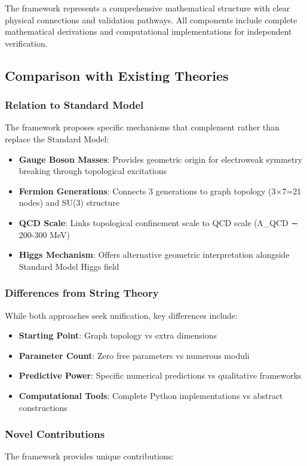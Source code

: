 \documentclass[12pt,a4paper]{article}
\begin{document}
The framework represents a comprehensive mathematical structure with clear physical connections and validation pathways. All components include complete mathematical derivations and computational implementations for independent verification.

\subsection{Comparison with Existing Theories}

\subsubsection{Relation to Standard Model}
The framework proposes specific mechanisms that complement rather than replace the Standard Model:

\begin{itemize}
\item \textbf{Gauge Boson Masses}: Provides geometric origin for electroweak symmetry breaking through topological excitations
\item \textbf{Fermion Generations}: Connects 3 generations to graph topology (3×7=21 nodes) and SU(3) structure
\item \textbf{QCD Scale}: Links topological confinement scale to QCD scale (Λ_{QCD} ∼ 200-300 MeV)
\item \textbf{Higgs Mechanism}: Offers alternative geometric interpretation alongside Standard Model Higgs field
\end{itemize}

\subsubsection{Differences from String Theory}
While both approaches seek unification, key differences include:

\begin{itemize}
\item \textbf{Starting Point}: Graph topology vs extra dimensions
\item \textbf{Parameter Count}: Zero free parameters vs numerous moduli
\item \textbf{Predictive Power}: Specific numerical predictions vs qualitative frameworks
\item \textbf{Computational Tools}: Complete Python implementations vs abstract constructions
\end{itemize}

\subsubsection{Novel Contributions}
The framework provides unique contributions:
\end{document}
